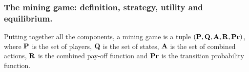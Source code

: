 \subsubsection{The mining game: definition, strategy, utility and equilibrium.}
Putting together all the components,  
a mining game is a tuple $(\mathbf{P},\mathbf{Q},\mathbf{A},\mathbf{R},\mathbf{Pr})$, where $\mathbf{P}$ is the set of players, $\mathbf{Q}$ is the set of states, $\mathbf{A}$ is the set of combined actions, $\mathbf{R}$ is the combined pay-off function 
and $\mathbf{Pr}$ is the transition probability function. 


